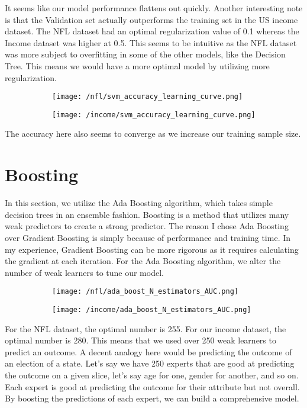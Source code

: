 \documentclass[12pt]{article}
\begin{document}
It seems like our model performance flattens out quickly. Another interesting note is that the Validation set actually outperforms the training set in the US income dataset. The NFL dataset had an optimal regularization value of 0.1 whereas the Income dataset was higher at 0.5. This seems to be intuitive as the NFL dataset was more subject to overfitting in some of the other models, like the Decision Tree. This means we would have a more optimal model by utilizing more regularization.

 \begin{figure}[H]
\begin{subfigure}{0.5\textwidth}
\centering
\texttt{[image: /nfl/svm\_accuracy\_learning\_curve.png]}
\end{subfigure}%
\begin{subfigure}{0.5\textwidth}
\centering
\texttt{[image: /income/svm\_accuracy\_learning\_curve.png]}
\end{subfigure}
\end{figure}

The accuracy here also seems to converge as we increase our training sample size.

\section{Boosting}
In this section, we utilize the Ada Boosting algorithm, which takes simple decision trees in an ensemble fashion. Boosting is a method that utilizes many weak predictors to create a strong predictor. The reason I chose Ada Boosting over Gradient Boosting is simply because of performance and training time. In my experience, Gradient Boosting can be more rigorous as it requires calculating the gradient at each iteration. For the Ada Boosting algorithm, we alter the number of weak learners to tune our model. 

\begin{figure}[H]
\begin{subfigure}{0.5\textwidth}
\centering
\texttt{[image: /nfl/ada\_boost\_N\_estimators\_AUC.png]}
\end{subfigure}%
\begin{subfigure}{0.5\textwidth}
\centering
\texttt{[image: /income/ada\_boost\_N\_estimators\_AUC.png]}
\end{subfigure}
\end{figure}

For the NFL dataset, the optimal number is 255. For our income dataset, the optimal number is 280.  This means that we used over 250 weak learners to predict an outcome. A decent analogy here would be predicting the outcome of an election of a state.  Let's say we have 250 experts that are good at predicting the outcome on a given slice, let's say age for one, gender for another, and so on. Each expert is good at predicting the outcome for their attribute but not overall. By boosting the predictions of each expert, we can build a comprehensive model. 
\end{document}
